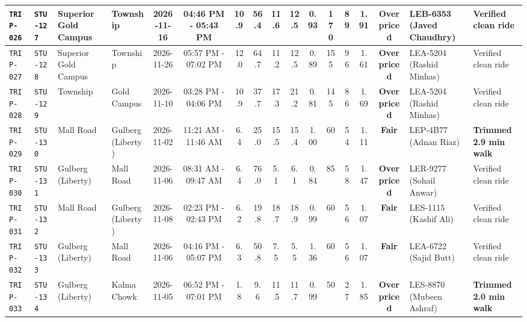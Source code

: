 \documentclass[9pt, a4paper, landscape]{article}
\begin{document}
\begin{table}[h!]
\begin{tabularx}{\textwidth}{|l|l|p{2.2cm}|p{2.3cm}|c|c|c|c|c|c|c|c|c|c|c|p{3.1cm}|X|}
\rowcolor{lightgray}\texttt{TRIP-026} & \texttt{STU-127} & Superior Gold Campus & Township & 2026-11-16 & 04:46 PM - 05:43 PM & 10.9 & 56.4 & 11.6 & 12.5 & 0.93 & 170 & 89 & 1.91 & \textcolor{accentred}{\textbf{Overpriced}} & LEB-6353 (Javed Chaudhry) & \textcolor{slate}{Verified clean ride} \\ \hline
\rowcolor{white}\texttt{TRIP-027} & \texttt{STU-128} & Superior Gold Campus & Township & 2026-11-26 & 05:57 PM - 07:02 PM & 12.0 & 64.7 & 11.2 & 12.5 & 0.89 & 155 & 96 & 1.61 & \textcolor{accentred}{\textbf{Overpriced}} & LEA-5204 (Rashid Minhas) & \textcolor{slate}{Verified clean ride} \\ \hline
\rowcolor{lightgray}\texttt{TRIP-028} & \texttt{STU-129} & Township & Gold Campus & 2026-11-10 & 03:28 PM - 04:06 PM & 10.9 & 37.7 & 17.3 & 21.2 & 0.81 & 145 & 86 & 1.69 & \textcolor{accentred}{\textbf{Overpriced}} & LEA-5204 (Rashid Minhas) & \textcolor{slate}{Verified clean ride} \\ \hline
\rowcolor{white}\texttt{TRIP-029} & \texttt{STU-130} & Mall Road & Gulberg (Liberty) & 2026-11-02 & 11:21 AM - 11:46 AM & 6.4 & 25.0 & 15.5 & 15.4 & 1.00 & 60 & 54 & 1.11 & \textcolor{accentteal}{\textbf{Fair}} & LEP-4B77 (Adnan Riaz) & \textcolor{accentblue}{\textbf{Trimmed 2.9 min walk}} \\ \hline
\rowcolor{lightgray}\texttt{TRIP-030} & \texttt{STU-131} & Gulberg (Liberty) & Mall Road & 2026-11-06 & 08:31 AM - 09:47 AM & 6.4 & 76.0 & 5.1 & 6.1 & 0.84 & 85 & 58 & 1.47 & \textcolor{accentred}{\textbf{Overpriced}} & LER-9277 (Sohail Anwar) & \textcolor{slate}{Verified clean ride} \\ \hline
\rowcolor{white}\texttt{TRIP-031} & \texttt{STU-132} & Mall Road & Gulberg (Liberty) & 2026-11-08 & 02:23 PM - 02:43 PM & 6.2 & 19.8 & 18.7 & 18.9 & 0.99 & 60 & 56 & 1.07 & \textcolor{accentteal}{\textbf{Fair}} & LES-1115 (Kashif Ali) & \textcolor{slate}{Verified clean ride} \\ \hline
\rowcolor{lightgray}\texttt{TRIP-032} & \texttt{STU-133} & Gulberg (Liberty) & Mall Road & 2026-11-06 & 04:16 PM - 05:07 PM & 6.3 & 50.8 & 7.5 & 5.5 & 1.36 & 60 & 56 & 1.07 & \textcolor{accentteal}{\textbf{Fair}} & LEA-6722 (Sajid Butt) & \textcolor{slate}{Verified clean ride} \\ \hline
\rowcolor{white}\texttt{TRIP-033} & \texttt{STU-134} & Gulberg (Liberty) & Kalma Chowk & 2026-11-05 & 06:52 PM - 07:01 PM & 1.8 & 9.6 & 11.5 & 11.7 & 0.99 & 50 & 27 & 1.85 & \textcolor{accentred}{\textbf{Overpriced}} & LES-8870 (Mubeen Ashraf) & \textcolor{accentblue}{\textbf{Trimmed 2.0 min walk}} \\ \hline

\end{tabularx}
\end{table}
\end{document}
